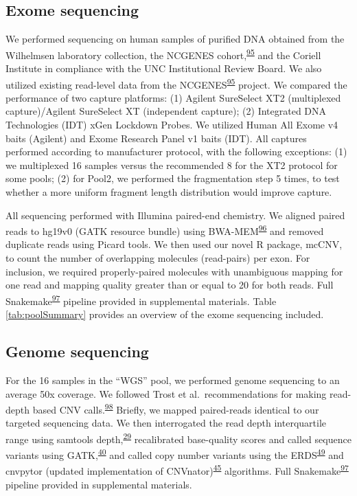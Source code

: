 \documentclass[11pt,letterpaper,oneside]{book}
\begin{document}
\hypertarget{exome-sequencing}{%
\subsection{Exome sequencing}\label{exome-sequencing}}

We performed sequencing on human samples of purified DNA obtained from the Wilhelmsen laboratory collection, the NCGENES cohort,\textsuperscript{\protect\hyperlink{ref-foreman:2013aa}{95}} and the Coriell Institute in compliance with the UNC Institutional Review Board.
We also utilized existing read-level data from the NCGENES\textsuperscript{\protect\hyperlink{ref-foreman:2013aa}{95}} project.
We compared the performance of two capture platforms: (1) Agilent SureSelect XT2 (multiplexed capture)/Agilent SureSelect XT (independent capture); (2) Integrated DNA Technologies (IDT) xGen Lockdown Probes.
We utilized Human All Exome v4 baits (Agilent) and Exome Research Panel v1 baits (IDT).
All captures performed according to manufacturer protocol, with the following exceptions: (1) we multiplexed 16 samples versus the recommended 8 for the XT2 protocol for some pools; (2) for Pool2, we performed the fragmentation step 5 times, to test whether a more uniform fragment length distribution would improve capture.

All sequencing performed with Illumina paired-end chemistry.
We aligned paired reads to hg19v0 (GATK resource bundle) using BWA-MEM\textsuperscript{\protect\hyperlink{ref-li:2013ab}{96}} and removed duplicate reads using Picard tools.
We then used our novel R package, mcCNV, to count the number of overlapping molecules (read-pairs) per exon.
For inclusion, we required properly-paired molecules with unambiguous mapping for one read and mapping quality greater than or equal to 20 for both reads.
Full Snakemake\textsuperscript{\protect\hyperlink{ref-koster:2012aa}{97}} pipeline provided in supplemental materials.
Table \ref{tab:poolSummary} provides an overview of the exome sequencing included.

\hypertarget{genome-sequencing}{%
\subsection{Genome sequencing}\label{genome-sequencing}}

For the 16 samples in the ``WGS'' pool, we performed genome sequencing to an average 50x coverage.
We followed Trost et al.~recommendations for making read-depth based CNV calls.\textsuperscript{\protect\hyperlink{ref-trost:2018aa}{98}}
Briefly, we mapped paired-reads identical to our targeted sequencing data.
We then interrogated the read depth interquartile range using samtools depth,\textsuperscript{\protect\hyperlink{ref-li:2009aa}{29}} recalibrated base-quality scores and called sequence variants using GATK,\textsuperscript{\protect\hyperlink{ref-van-der-auwera:2013aa}{40}} and called copy number variants using the ERDS\textsuperscript{\protect\hyperlink{ref-zhu:2012aa}{49}} and cnvpytor (updated implementation of CNVnator)\textsuperscript{\protect\hyperlink{ref-abyzov:2011aa}{45}} algorithms.
Full Snakemake\textsuperscript{\protect\hyperlink{ref-koster:2012aa}{97}} pipeline provided in supplemental materials.
\end{document}
